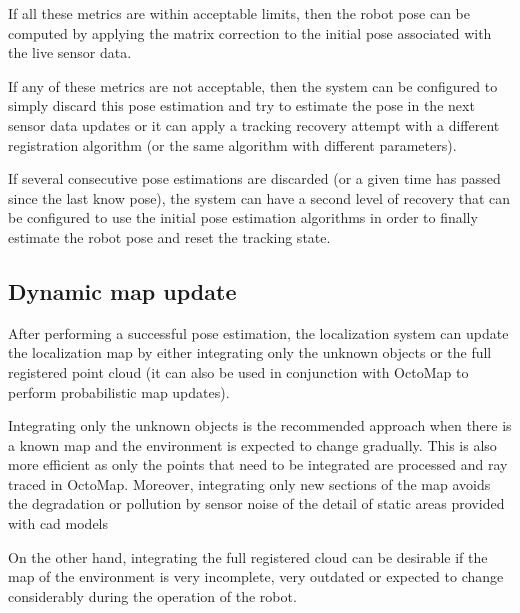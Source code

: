 If all these metrics are within acceptable limits, then the robot pose can be computed by applying the matrix correction to the initial pose associated with the live sensor data.

If any of these metrics are not acceptable, then the system can be configured to simply discard this pose estimation and try to estimate the pose in the next sensor data updates or it can apply a tracking recovery attempt with a different registration algorithm (or the same algorithm with different parameters).

If several consecutive pose estimations are discarded (or a given time has passed since the last know pose), the system can have a second level of recovery that can be configured to use the initial pose estimation algorithms in order to finally estimate the robot pose and reset the tracking state.


\subsection{Dynamic map update}

After performing a successful pose estimation, the localization system can update the localization map by either integrating only the unknown objects or the full registered point cloud (it can also be used in conjunction with OctoMap \cite{Hornung2013} to perform probabilistic map updates).

Integrating only the unknown objects is the recommended approach when there is a known map and the environment is expected to change gradually. This is also more efficient as only the points that need to be integrated are processed and ray traced in OctoMap. Moreover, integrating only new sections of the map avoids the degradation or pollution by sensor noise of the detail of static areas provided with \gls{cad} models

 On the other hand, integrating the full registered cloud can be desirable if the map of the environment is very incomplete, very outdated or expected to change considerably during the operation of the robot.
